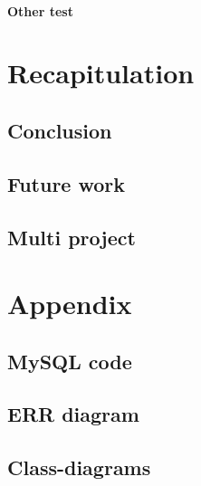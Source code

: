       \subsubsection{Other test}

\chapter{Recapitulation}
  \section{Conclusion}
  \section{Future work}
  \section{Multi project} %

\appendix
	\chapter{Appendix}
	\section{MySQL code}
	\label{MySQLcode}
		
	\section{ERR diagram}
	\label{errDiagram}
		
	\section{Class-diagrams}
	\label{app:Class-diagrams}
		



\appendix


